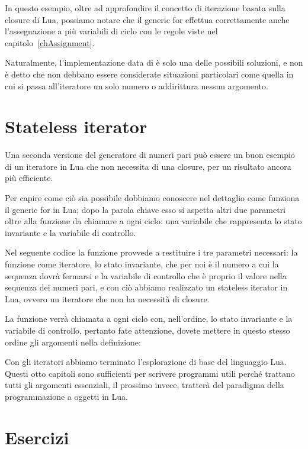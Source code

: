 In questo esempio, oltre ad approfondire il concetto di iterazione basata sulla
closure di Lua, possiamo notare che il generic for effettua correttamente anche
l'assegnazione a più variabili di ciclo con le regole viste nel
capitolo~\ref{chAssignment}.

Naturalmente, l'implementazione data di  è solo una delle possibili
soluzioni, e non è detto che non debbano essere considerate situazioni
particolari come quella in cui si passa all'iteratore un solo numero o
addirittura nessun argomento.


\section{Stateless iterator}

Una seconda versione del generatore di numeri pari può essere un buon esempio
di un iteratore in Lua che non necessita di una closure, per un risultato ancora
più efficiente.

Per capire come ciò sia possibile dobbiamo conoscere nel dettaglio come
funziona il generic for in Lua; dopo la parola chiave  esso si aspetta
altri due parametri oltre alla funzione da chiamare a ogni ciclo: una variabile
che rappresenta lo stato invariante e la variabile di controllo.

Nel seguente codice la funzione  provvede a restituire i tre
parametri necessari: la funzione  come iteratore, lo stato
invariante, che per noi è il numero a cui la sequenza dovrà fermarsi e la
variabile di controllo che è proprio il valore nella sequenza dei numeri pari,
e con ciò abbiamo realizzato un stateless iterator in Lua, ovvero un iteratore
che non ha necessità di closure.

La funzione  verrà chiamata a ogni ciclo con, nell'ordine, lo
stato invariante e la variabile di controllo, pertanto fate attenzione, dovete
mettere in questo stesso ordine gli argomenti nella definizione:

Con gli iteratori abbiamo terminato l'esplorazione di base del linguaggio Lua.
Questi otto capitoli sono sufficienti per scrivere programmi utili perché
trattano tutti gli argomenti essenziali, il prossimo invece, tratterà del
paradigma della programmazione a oggetti in Lua.


\section{Esercizi}

